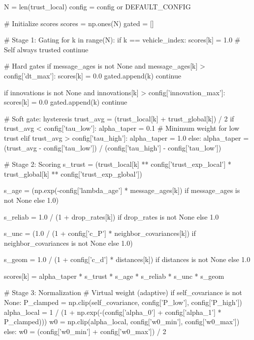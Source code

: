     N = len(trust_local)
    config = config or DEFAULT_CONFIG
    
    # Initialize scores
    scores = np.ones(N)
    gated = []
    
    # Stage 1: Gating
    for k in range(N):
        if k == vehicle_index:
            scores[k] = 1.0  # Self always trusted
            continue
        
        # Hard gates
        if message_ages is not None and message_ages[k] > config['dt_max']:
            scores[k] = 0.0
            gated.append(k)
            continue
        
        if innovations is not None and innovations[k] > config['innovation_max']:
            scores[k] = 0.0
            gated.append(k)
            continue
        
        # Soft gate: hysteresis
        trust_avg = (trust_local[k] + trust_global[k]) / 2
        if trust_avg < config['tau_low']:
            alpha_taper = 0.1  # Minimum weight for low trust
        elif trust_avg > config['tau_high']:
            alpha_taper = 1.0
        else:
            alpha_taper = (trust_avg - config['tau_low']) / (config['tau_high'] - config['tau_low'])
        
        # Stage 2: Scoring
        s_trust = (trust_local[k] ** config['trust_exp_local'] * 
                   trust_global[k] ** config['trust_exp_global'])
        
        s_age = (np.exp(-config['lambda_age'] * message_ages[k]) 
                 if message_ages is not None else 1.0)
        
        s_reliab = 1.0 / (1 + drop_rates[k]) if drop_rates is not None else 1.0
        
        s_unc = (1.0 / (1 + config['c_P'] * neighbor_covariances[k]) 
                 if neighbor_covariances is not None else 1.0)
        
        s_geom = 1.0 / (1 + config['c_d'] * distances[k]) if distances is not None else 1.0
        
        scores[k] = alpha_taper * s_trust * s_age * s_reliab * s_unc * s_geom
    
    # Stage 3: Normalization
    # Virtual weight (adaptive)
    if self_covariance is not None:
        P_clamped = np.clip(self_covariance, config['P_low'], config['P_high'])
        alpha_local = 1 / (1 + np.exp(-(config['alpha_0'] + config['alpha_1'] * P_clamped)))
        w0 = np.clip(alpha_local, config['w0_min'], config['w0_max'])
    else:
        w0 = (config['w0_min'] + config['w0_max']) / 2
    

